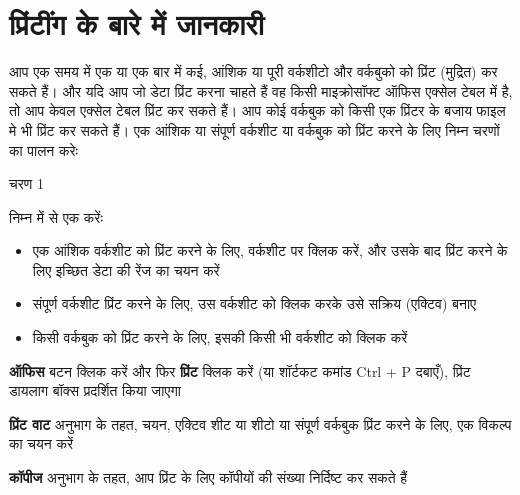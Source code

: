 \section{प्रिंटींग के बारे में जानकारी}\label{id-1.25}

आप एक समय में एक या एक बार में कई, आंशिक या पूरी वर्कशीटो और वर्कबुको को प्रिंट (मुद्रित) कर सकते हैं। और यदि आप जो डेटा प्रिंट करना चाहते हैं वह किसी माइक्रोसॉफ्ट ऑफिस एक्सेल टेबल में है, तो आप केवल एक्सेल टेबल प्रिंट कर सकते हैं। आप कोई वर्कबुक को किसी एक प्रिंटर के बजाय फाइल मे भी प्रिंट कर सकते हैं। एक आंशिक या संपूर्ण वर्कशीट या वर्कबुक को प्रिंट करने के लिए निम्न चरणों का पालन करेः

\begin{descriptionSimple}{चरण 1}
\item[चरण 1] निम्न में से एक करेंः
			\begin{itemize}[topsep=-1ex,parsep=0ex,partopsep=0ex,itemsep=0.5ex]
			\item एक आंशिक वर्कशीट को प्रिंट करने के लिए, वर्कशीट पर क्लिक करें, और उसके बाद प्रिंट करने के लिए इच्छित डेटा की रेंज का चयन करें
			\item संपूर्ण वर्कशीट प्रिंट करने के लिए, उस वर्कशीट को क्लिक करके उसे सक्रिय (एक्टिव) बनाए
			\item किसी वर्कबुक को प्रिंट करने के लिए, इसकी किसी भी वर्कशीट को क्लिक करें
			\end{itemize}
\item[चरण 2] \textbf{ऑफिस} बटन क्लिक करें और फिर \textbf{प्रिंट} क्लिक करें (या शॉर्टकट कमांड  {\eng Ctrl + P}  दबाएँ), प्रिंट डायलाग बॉक्स प्रदर्शित किया जाएगा
\item[चरण 3] \textbf{प्रिंट वाट} अनुभाग के तहत, चयन, एक्टिव शीट या शीटो या संपूर्ण वर्कबुक प्रिंट करने के लिए, एक विकल्प का चयन करें
\item[चरण 4] \textbf{कॉपीज} अनुभाग के तहत, आप प्रिंट के लिए कॉपीयों की संख्या निर्दिष्ट कर सकते हैं
\end{descriptionSimple}
